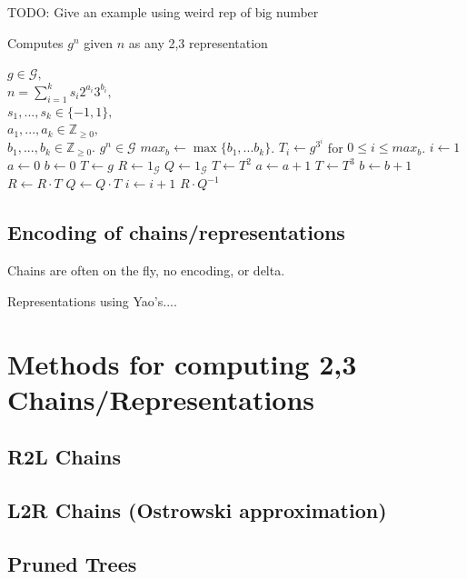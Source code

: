 \documentclass{ucalgthes1}
\theoremstyle{plain}
\theoremstyle{definition}
\newcommand{\ZZgez}{\mathbb{Z}_{\ge 0}}
\begin{document}
TODO: Give an example using weird rep of big number


\begin{algorithm}[htb!]
\caption{Computes $g^n$ given $n$ as any 2,3 representation}\label{alg:yaos}
\begin{algorithmic}[1]
\REQUIRE $g \in \mathcal G,$ \\
$n = \sum_{i=1}^k s_i2^{a_i}3^{b_i},$ \\
$s_1,...,s_k \in \{-1, 1\},$ \\
$a_1,...,a_k \in \ZZgez,$ \\
$b_1,...,b_k \in \ZZgez.$
\ENSURE $g^n \in \mathcal G$
\STATE $max_b \gets \max \{ b_1, ... b_k \}$.
\STATE $T_i \gets g^{3^i}$ for $0 \le i \le max_b$.
\STATE $i \gets 1$
\STATE $a \gets 0$ 
\STATE $b \gets 0$ 
\STATE $T \gets g$ 
\STATE $R \gets 1_{\mathcal G}$ 
\STATE $Q \gets 1_{\mathcal G}$ 
		\STATE $T \gets T^2$
		\STATE $a \gets a + 1$
	\ENDWHILE
		\STATE $T \gets T^3$
		\STATE $b \gets b + 1$
	\ENDWHILE
		\STATE $R \gets R \cdot T$
	\ELSE
		\STATE $Q \gets Q \cdot T$
	\ENDIF
	\STATE $i \gets i + 1$
\ENDWHILE
\RETURN $R \cdot Q^{-1}$
\end{algorithmic}
\end{algorithm}




\bigbreak
\subsection{Encoding of chains/representations}

Chains are often on the fly, no encoding, or delta.

Representations using Yao's....


\pagebreak
\bigbreak
\section{Methods for computing 2,3 Chains/Representations}\label{section:dbnsMethods}

\bigbreak
\subsection{R2L Chains}

\bigbreak
\subsection{L2R Chains (Ostrowski approximation)}

\bigbreak
\subsection{Pruned Trees}
\end{document}
